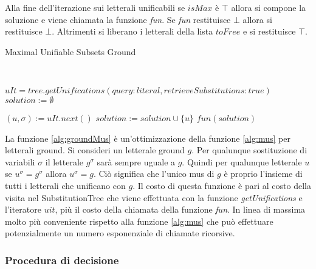 \documentclass[./main.tex]{subfiles}
\begin{document}
Alla fine dell'iterazione sui letterali unificabili se $isMax$ è $\top$ 
allora si compone la soluzione e viene chiamata la funzione \textit{fun}.
Se \textit{fun} restituisce $\bot$ allora si restituisce $\bot$.
Altrimenti si liberano i letterali della lista $toFree$ e si restituisce $\top$.


\begin{algorithm}[H] \label{alg:groundMus}
    \caption{Maximal Unifiable Subsets Ground}
    \\

$uIt = tree.getUnifications(query: literal, retrieveSubstitutions: true)$\;
$solution := \emptyset$\;

 {
    $(u, \sigma) := uIt.next()$\;
     {
        $solution := solution \cup \{u\}$\;
    }
}
\Return $fun(solution)$\;
\end{algorithm}

La funzione \ref{alg:groundMus} è un'ottimizzazione della funzione \ref{alg:mus} per letterali ground.
Si consideri un letterale ground $g$. Per qualunque sostituzione di variabili $\sigma$ 
il letterale $g^\sigma$ sarà sempre uguale a $g$. Quindi per qualunque letterale $u$ se $u^\sigma = g^\sigma$ allora $u^\sigma = g$.
Ciò significa che l'unico mus di $g$ è proprio l'insieme di tutti i letterali che unificano con $g$.
Il costo di questa funzione è pari al costo della visita nel SubstitutionTree che viene effettuata con la funzione \textit{getUnifications}
e l'iteratore $uit$,
più il costo della chiamata della funzione \textit{fun}.
In linea di massima molto più conveniente rispetto alla funzione \ref{alg:mus} che può effettuare potenzialmente un numero esponenziale 
di chiamate ricorsive. 


\subsubsection{Procedura di decisione}
\end{document}
